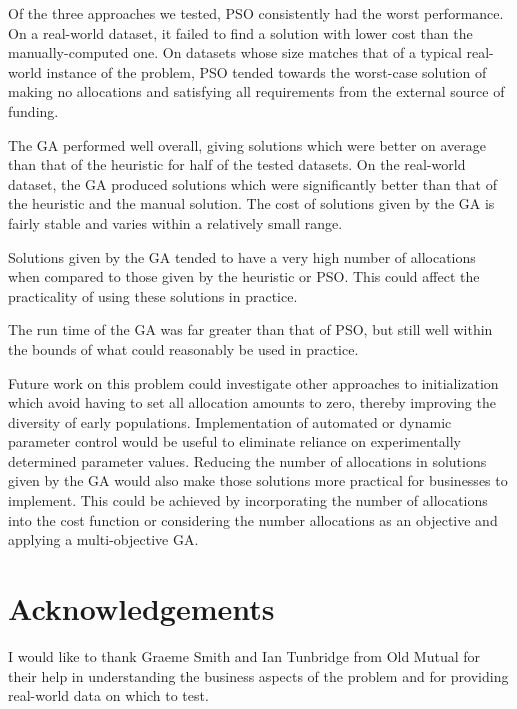 \documentclass{sig-alternate}
\begin{document}
Of the three approaches we tested, PSO consistently had the worst performance. On a real-world dataset, it failed to find a solution with lower cost than the manually-computed one. On datasets whose size matches that of a typical real-world instance of the problem, PSO tended towards the worst-case solution of making no allocations and satisfying all requirements from the external source of funding.

The GA performed well overall, giving solutions which were better on average than that of the heuristic for half of the tested datasets. On the real-world dataset, the GA produced solutions which were significantly better than that of the heuristic and the manual solution. The cost of solutions given by the GA is fairly stable and varies within a relatively small range.

Solutions given by the GA tended to have a very high number of allocations when compared to those given by the heuristic or PSO. This could affect the practicality of using these solutions in practice.

The run time of the GA was far greater than that of PSO, but still well within the bounds of what could reasonably be used in practice.

Future work on this problem could investigate other approaches to initialization which avoid having to set all allocation amounts to zero, thereby improving the diversity of early populations. Implementation of automated or dynamic parameter control would be useful to eliminate reliance on experimentally determined parameter values. Reducing the number of allocations in solutions given by the GA would also make those solutions more practical for businesses to implement. This could be achieved by incorporating the number of allocations into the cost function or considering the number allocations as an objective and applying a multi-objective GA.

\section{Acknowledgements}
I would like to thank Graeme Smith and Ian Tunbridge from Old Mutual for their help in understanding the business aspects of the problem and for providing real-world data on which to test.
\balance


\end{document}

